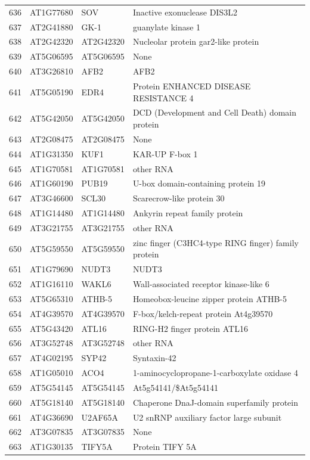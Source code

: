 \documentclass[11pt]{article}
\begin{document}
\begin{center}
\begin{tabular}{rlll}
636 & AT1G77680 & SOV & Inactive exonuclease DIS3L2\\
637 & AT2G41880 & GK-1 & guanylate kinase 1\\
638 & AT2G42320 & AT2G42320 & Nucleolar protein gar2-like protein\\
639 & AT5G06595 & AT5G06595 & None\\
640 & AT3G26810 & AFB2 & AFB2\\
641 & AT5G05190 & EDR4 & Protein ENHANCED DISEASE RESISTANCE 4\\
642 & AT5G42050 & AT5G42050 & DCD (Development and Cell Death) domain protein\\
643 & AT2G08475 & AT2G08475 & None\\
644 & AT1G31350 & KUF1 & KAR-UP F-box 1\\
645 & AT1G70581 & AT1G70581 & other RNA\\
646 & AT1G60190 & PUB19 & U-box domain-containing protein 19\\
647 & AT3G46600 & SCL30 & Scarecrow-like protein 30\\
648 & AT1G14480 & AT1G14480 & Ankyrin repeat family protein\\
649 & AT3G21755 & AT3G21755 & other RNA\\
650 & AT5G59550 & AT5G59550 & zinc finger (C3HC4-type RING finger) family protein\\
651 & AT1G79690 & NUDT3 & NUDT3\\
652 & AT1G16110 & WAKL6 & Wall-associated receptor kinase-like 6\\
653 & AT5G65310 & ATHB-5 & Homeobox-leucine zipper protein ATHB-5\\
654 & AT4G39570 & AT4G39570 & F-box/kelch-repeat protein At4g39570\\
655 & AT5G43420 & ATL16 & RING-H2 finger protein ATL16\\
656 & AT3G52748 & AT3G52748 & other RNA\\
657 & AT4G02195 & SYP42 & Syntaxin-42\\
658 & AT1G05010 & ACO4 & 1-aminocyclopropane-1-carboxylate oxidase 4\\
659 & AT5G54145 & AT5G54145 & At5g54141/\$At5g54141\\
660 & AT5G18140 & AT5G18140 & Chaperone DnaJ-domain superfamily protein\\
661 & AT4G36690 & U2AF65A & U2 snRNP auxiliary factor large subunit\\
662 & AT3G07835 & AT3G07835 & None\\
663 & AT1G30135 & TIFY5A & Protein TIFY 5A\\

\end{tabular}
\end{center}
\end{document}
